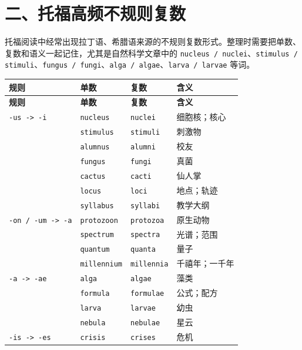 \documentclass[UTF8,zihao=-4]{ctexart}
\begin{document}
\section*{二、托福高频不规则复数}

托福阅读中经常出现拉丁语、希腊语来源的不规则复数形式。整理时需要把单数、复数和语义一起记住，尤其是自然科学文章中的 \texttt{nucleus / nuclei}、\texttt{stimulus / stimuli}、\texttt{fungus / fungi}、\texttt{alga / algae}、\texttt{larva / larvae} 等词。

\begin{longtable}{>{\raggedright\arraybackslash}p{3.2cm} >{\raggedright\arraybackslash}p{4.2cm} >{\raggedright\arraybackslash}p{4.2cm} >{\raggedright\arraybackslash}p{3.3cm}}
\toprule
\textbf{规则} & \textbf{单数} & \textbf{复数} & \textbf{含义} \\
\midrule
\endfirsthead
\toprule
\textbf{规则} & \textbf{单数} & \textbf{复数} & \textbf{含义} \\
\midrule
\endhead
\texttt{-us -> -i} & \texttt{nucleus} & \texttt{nuclei} & 细胞核；核心 \\
 & \texttt{stimulus} & \texttt{stimuli} & 刺激物 \\
 & \texttt{alumnus} & \texttt{alumni} & 校友 \\
 & \texttt{fungus} & \texttt{fungi} & 真菌 \\
 & \texttt{cactus} & \texttt{cacti} & 仙人掌 \\
 & \texttt{locus} & \texttt{loci} & 地点；轨迹 \\
 & \texttt{syllabus} & \texttt{syllabi} & 教学大纲 \\
\texttt{-on / -um -> -a} & \texttt{protozoon} & \texttt{protozoa} & 原生动物 \\
 & \texttt{spectrum} & \texttt{spectra} & 光谱；范围 \\
 & \texttt{quantum} & \texttt{quanta} & 量子 \\
 & \texttt{millennium} & \texttt{millennia} & 千禧年；一千年 \\
\texttt{-a -> -ae} & \texttt{alga} & \texttt{algae} & 藻类 \\
 & \texttt{formula} & \texttt{formulae} & 公式；配方 \\
 & \texttt{larva} & \texttt{larvae} & 幼虫 \\
 & \texttt{nebula} & \texttt{nebulae} & 星云 \\
\texttt{-is -> -es} & \texttt{crisis} & \texttt{crises} & 危机 \\
\bottomrule
\end{longtable}
\end{document}
